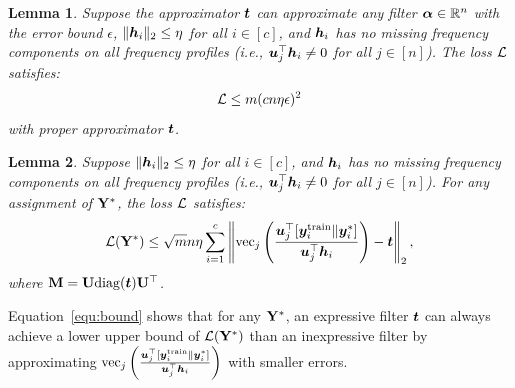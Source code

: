\documentclass{article} %
\def\valpha{{\bm\alpha}}
\newtheorem{lemma}{\textbf{Lemma}}
\begin{document}
	\begin{lemma}
		\label{prop:loss_bound}
		Suppose the approximator ${\bm{t}}$ can approximate any filter $\valpha\in\sR^n$ with the error bound $\epsilon$, $\|{\bm{h}}_i\|_2\leq\eta$ for all $i\in[c]$, and ${\bm{h}}_i$ has no missing frequency components on all frequency profiles (i.e., ${\bm{u}}_j^{\top}{\bm{h}}_i\neq 0$ for all $j\in[n]$). The loss ${\mathcal{L}}$ satisfies:
		\begin{equation}
			\label{equ:bound}
			\begin{aligned}
				{\mathcal{L}}\leq m(cn\eta\epsilon)^2
			\end{aligned}
		\end{equation}
		with proper approximator ${\bm{t}}$.
	\end{lemma}
	
	\begin{lemma}
		\label{prop:loss_bound}
		Suppose $\|{\bm{h}}_i\|_2\leq\eta$ for all $i\in[c]$, and ${\bm{h}}_i$ has no missing frequency components on all frequency profiles (i.e., ${\bm{u}}_j^{\top}{\bm{h}}_i\neq 0$ for all $j\in[n]$). For any assignment of ${\mathbf{Y}}^*$, the loss ${\mathcal{L}}$ satisfies:
		\begin{equation}
			\label{equ:bound}
			\begin{aligned}
				{\mathcal{L}}({\mathbf{Y}}^*)\leq\sqrt{m}n\eta\sum_{i=1}^c\left\|\mathrm{vec}_j\left(\frac{{\bm{u}}_j^{\top}[{\bm{y}}^{\textrm{train}}_i\|{\bm{y}}^*_i]}{{\bm{u}}_j^{\top}{\bm{h}}_i}\right)-{\bm{t}}\right\|_2,
			\end{aligned}
		\end{equation}
		where ${\mathbf{M}}={\mathbf{U}}\mathrm{diag}({\bm{t}}){\mathbf{U}}^{\top}$.
	\end{lemma}
	Equation~\ref{equ:bound} shows that for any ${\mathbf{Y}}^*$, an expressive filter ${\bm{t}}$ can always achieve a lower upper bound of ${\mathcal{L}}({\mathbf{Y}}^*)$ than an inexpressive filter by approximating $\mathrm{vec}_j\left(\frac{{\bm{u}}_j^{\top}[{\bm{y}}^{\textrm{train}}_i\|{\bm{y}}^*_i]}{{\bm{u}}_j^{\top}{\bm{h}}_i}\right)$ with smaller errors.
	
	
	
\end{document}
